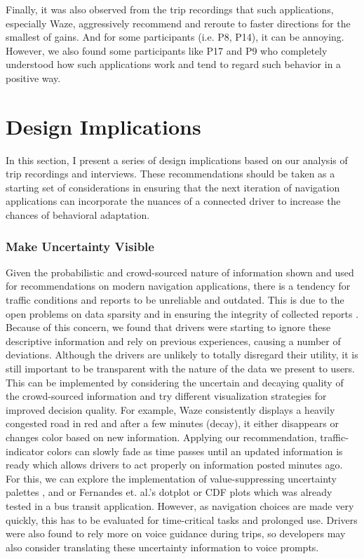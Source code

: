 Finally, it was also observed from the trip recordings that such applications, especially Waze, aggressively recommend and reroute to faster directions for the smallest of gains. And for some participants (i.e. P8, P14), it can be annoying. However, we also found some participants like P17 and P9 who completely understood how such applications work and tend to regard such behavior in a positive way.

\section{Design Implications}
In this section, I present a series of design implications based on our analysis of trip recordings and interviews. These recommendations should be taken as a starting set of considerations in ensuring that the next iteration of navigation applications can incorporate the nuances of a connected driver to increase the chances of behavioral adaptation.

\subsubsection{Make Uncertainty Visible}
Given the probabilistic and crowd-sourced nature of information shown and used for recommendations on modern navigation applications, there is a tendency for traffic conditions and reports to be unreliable and outdated. This is due to the open problems on data sparsity and in ensuring the integrity of collected reports \cite{Attard2016TheSystems,QingYang2015TowardNetworks,Vyroubal2016MobileSystems}. Because of this concern, we found that drivers were starting to ignore these descriptive information and rely on previous experiences, causing a number of deviations. Although the drivers are unlikely to totally disregard their utility, it is still important to be transparent with the nature of the data we present to users. This can be implemented by considering the uncertain and decaying quality of the crowd-sourced information and try different visualization strategies for improved decision quality. For example, Waze consistently displays a heavily congested road in red and after a few minutes (decay), it either disappears or changes color based on new information. Applying our recommendation, traffic-indicator colors can slowly fade as time passes until an updated information is ready which allows drivers to act properly on information posted minutes ago. For this, we can explore the implementation of value-suppressing uncertainty palettes \cite{Correll2018Value-SuppressingPalettes}, and or Fernandes et. al.'s \cite{Fernandes2018UncertaintyDecision-Making} dotplot or CDF plots which was already tested in a bus transit application. However, as navigation choices are made very quickly, this has to be evaluated for time-critical tasks and prolonged use. Drivers were also found to rely more on voice guidance during trips, so developers may also consider translating these uncertainty information to voice prompts.

